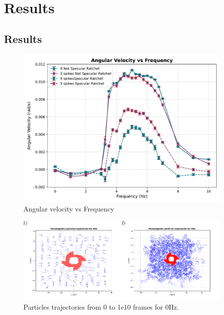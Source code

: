 \part{Results}
\label{part:results}

\chapter{Results}

\begin{figure}
  \begin{center}
    \includegraphics[width=0.95\textwidth]{figures/AvsF.pdf}
  \end{center}
  \caption[Angular velocity graph.]{Angular velocity vs Frequency}\label{fig:angularvsfrequency}
\end{figure}

\begin{figure}
  \begin{center}
    \includegraphics[width=0.95\textwidth]{figures/particlesTrj.pdf}
  \end{center}
  \caption[Particles trajectories]{Particles trajectories from 0 to 1e10 frames for 0Hz.}\label{fig:particletrj}
\end{figure}

